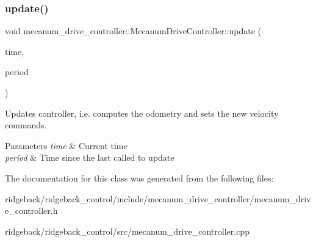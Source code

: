 \subsubsection{\texorpdfstring{update()}{update()}}
{\footnotesize\ttfamily void mecanum\+\_\+drive\+\_\+controller\+::\+Mecanum\+Drive\+Controller\+::update (\begin{DoxyParamCaption}\item[{const ros\+::\+Time \&}]{time,  }\item[{const ros\+::\+Duration \&}]{period }\end{DoxyParamCaption})}



Updates controller, i.\+e. computes the odometry and sets the new velocity commands. 


\begin{DoxyParams}{Parameters}
{\em time} & Current time \\
\hline
{\em period} & Time since the last called to update \\
\hline
\end{DoxyParams}


The documentation for this class was generated from the following files\+:\begin{DoxyCompactItemize}
\item 
ridgeback/ridgeback\+\_\+control/include/mecanum\+\_\+drive\+\_\+controller/mecanum\+\_\+drive\+\_\+controller.\+h\item 
ridgeback/ridgeback\+\_\+control/src/mecanum\+\_\+drive\+\_\+controller.\+cpp\end{DoxyCompactItemize}
